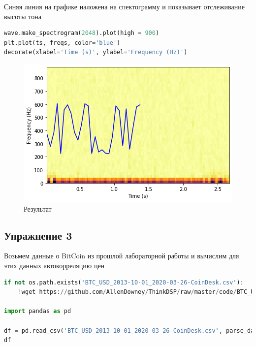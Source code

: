 Синяя линия на графике наложена на спектограмму и показывает отслеживание высоты тона

\begin{lstlisting}[language=Python]
wave.make_spectrogram(2048).plot(high = 900)
plt.plot(ts, freqs, color='blue')
decorate(xlabel='Time (s)', ylabel='Frequency (Hz)')
\end{lstlisting}

\begin{figure}[H]
	\begin{center}
		\includegraphics[scale=1]{fig/lab05/lab05_04.png}
		\caption{Результат}
	\end{center}
\end{figure}


\subsection{Упражнение 3}

Возьмем данные о BitCoin из прошлой лабораторной работы и вычислим для этих данных автокорреляцию цен

\begin{lstlisting}[language=Python]
if not os.path.exists('BTC_USD_2013-10-01_2020-03-26-CoinDesk.csv'):
    !wget https://github.com/AllenDowney/ThinkDSP/raw/master/code/BTC_USD_2013-10-01_2020-03-26-CoinDesk.csv
    
import pandas as pd

df = pd.read_csv('BTC_USD_2013-10-01_2020-03-26-CoinDesk.csv', parse_dates=[0])
df

\end{lstlisting}

